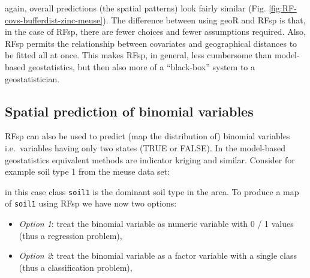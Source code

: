 \documentclass[graybox,natbib,nospthms,UStrade]{svmono}
\newenvironment{Shaded}{\begin{snugshade}}{\end{snugshade}}
\newcommand{\CommentTok}[1]{\textcolor[rgb]{0.37,0.37,0.37}{\textit{#1}}}
\newcommand{\DecValTok}[1]{\textcolor[rgb]{0.06,0.06,0.06}{#1}}
\newcommand{\KeywordTok}[1]{\textcolor[rgb]{0.27,0.27,0.27}{\textbf{#1}}}
\newcommand{\NormalTok}[1]{#1}
\newcommand{\OperatorTok}[1]{\textcolor[rgb]{0.43,0.43,0.43}{\textbf{#1}}}
\newcommand{\StringTok}[1]{\textcolor[rgb]{0.5,0.5,0.5}{#1}}
\providecommand{\tightlist}{%
  \setlength{\itemsep}{0pt}\setlength{\parskip}{0pt}}
\providecommand{\tightlist}{\setlength{\itemsep}{0pt}\setlength{\parskip}{0pt}}
\begin{document}
again, overall predictions (the spatial patterns) look fairly similar (Fig. \ref{fig:RF-covs-bufferdist-zinc-meuse}).
The difference between using geoR and RFsp is that, in the case of RFsp, there are fewer choices
and fewer assumptions required. Also, RFsp permits the relationship between covariates
and geographical distances to be fitted all at once. This makes RFsp, in general, less
cumbersome than model-based geostatistics, but then also more of a ``black-box'' system
to a geostatistician.

\hypertarget{spatial-prediction-of-binomial-variables}{%
\subsection{Spatial prediction of binomial variables}\label{spatial-prediction-of-binomial-variables}}

RFsp can also be used to predict (map the distribution of) binomial variables i.e.~variables having only two states (TRUE or FALSE). In the model-based geostatistics equivalent methods are indicator kriging and similar. Consider for example soil type 1 from the meuse data set:

\begin{Shaded}
\end{Shaded}

in this case class \texttt{soil1} is the dominant soil type in the area. To produce a map of \texttt{soil1} using RFsp we have now two options:

\begin{itemize}
\tightlist
\item
  \emph{Option 1}: treat the binomial variable as numeric variable with 0 / 1 values (thus a regression problem),
\item
  \emph{Option 2}: treat the binomial variable as a factor variable with a single class (thus a classification problem),
\end{itemize}
\end{document}
